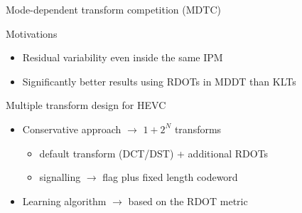 \documentclass[10pt]{beamer} %
\begin{document}
\begin{frame}{Mode-dependent transform competition (MDTC)}
	\begin{block}{Motivations}
		\begin{itemize}
			\item Residual variability even inside the same IPM
			\item Significantly better results using RDOTs in MDDT than KLTs
		\end{itemize}
	\end{block}
	\begin{block}{Multiple transform design for HEVC}
		\begin{itemize}
			\item Conservative approach $\to$ $1+2^N$ transforms
				\begin{itemize}
					\item default transform (DCT/DST) + additional RDOTs
					\item signalling $\to$ flag plus fixed length codeword
				\end{itemize}
			\item Learning algorithm $\to$ based on the RDOT metric
		\end{itemize}
	\end{block}
\end{frame}
\end{document}
